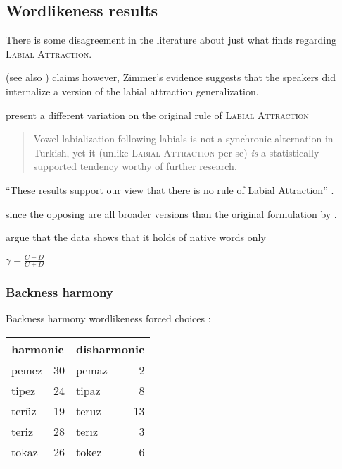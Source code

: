 \subsection{Wordlikeness results}

There is some disagreement in the literature about just what \citet{Zimmer1969} finds regarding \textsc{Labial Attraction}.

\citet{Zimmer1969}
(see also \citet[][4]{Zuraw2000})
claims however, Zimmer's evidence suggests that the speakers did internalize a version of the labial attraction generalization.

\citet{Inkelas2001} present a different variation on the original rule of \textsc{Labial Attraction}

\begin{quote}
Vowel labialization following labials is not a synchronic alternation in Turkish, yet it (unlike \textsc{Labial Attraction} per se) \emph{is} a statistically supported tendency worthy of further research. \citep[][196, emphasis in original]{Inkelas2001}
\end{quote}

``These results support our view that there is no rule of Labial Attraction'' \citep[][225]{Clements1982}.

since the opposing are all broader versions than the original formulation by \citeauthor{Lees1966a}.

\citet{Ito1993} argue that the data shows that it holds of native words only

\citet{Goodman1954}

\begin{example}
$\displaystyle \gamma = \frac{C - D}{C + D}$
\end{example}

\subsubsection{Backness harmony}


\begin{example}
Backness harmony wordlikeness forced choices \citep[314]{Zimmer1969}: 

\vspace{0.5\baselineskip}
\begin{tabular}{l r l r}
\toprule
\multicolumn{2}{l}{harmonic} & \multicolumn{2}{l}{disharmonic} \\
\midrule
pemez & 30                   & pemaz & 2  \\
tipez & 24                   & tipaz & 8  \\ 
terüz & 19                   & teruz & 13 \\ %
teriz & 28                   & terız & 3  \\
tokaz & 26                   & tokez & 6  \\ %
\bottomrule
\end{tabular}
\end{example}

